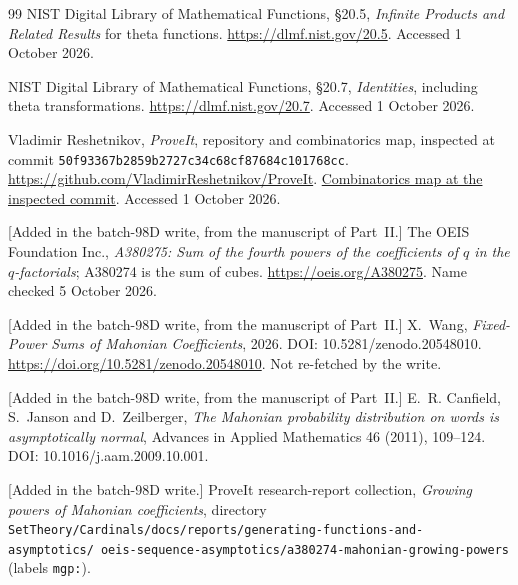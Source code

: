 \documentclass[11pt,a4paper]{article}
\numberwithin{equation}{section}
\theoremstyle{definition}
\newcommand{\code}[1]{\texttt{#1}}
\begin{document}
\begin{thebibliography}{99}
NIST Digital Library of Mathematical Functions,
\S20.5, \emph{Infinite Products and Related Results} for theta functions.
\url{https://dlmf.nist.gov/20.5}. Accessed 1 October 2026.

NIST Digital Library of Mathematical Functions,
\S20.7, \emph{Identities}, including theta transformations.
\url{https://dlmf.nist.gov/20.7}. Accessed 1 October 2026.

Vladimir Reshetnikov, \emph{ProveIt}, repository and combinatorics map,
inspected at commit
\texttt{50f93367b2859b2727c34c68cf87684c101768cc}.
\url{https://github.com/VladimirReshetnikov/ProveIt}.
\href{https://github.com/VladimirReshetnikov/ProveIt/blob/50f93367b2859b2727c34c68cf87684c101768cc/Combinatorics/README.md}{Combinatorics map at the inspected commit}.
Accessed 1 October 2026.

[Added in the batch-98D write, from the manuscript of Part~II.] The OEIS
Foundation Inc., \emph{A380275: Sum of the fourth powers of the
coefficients of $q$ in the $q$-factorials}; A380274 is the sum of cubes.
\url{https://oeis.org/A380275}. Name checked 5 October 2026.

[Added in the batch-98D write, from the manuscript of Part~II.]
X.~Wang, \emph{Fixed-Power Sums of Mahonian Coefficients}, 2026.
DOI: 10.5281/zenodo.20548010.
\url{https://doi.org/10.5281/zenodo.20548010}. Not re-fetched by the
write.

[Added in the batch-98D write, from the manuscript of Part~II.]
E.~R. Canfield, S.~Janson and D.~Zeilberger, \emph{The Mahonian
probability distribution on words is asymptotically normal}, Advances in
Applied Mathematics 46 (2011), 109--124. DOI: 10.1016/j.aam.2009.10.001.

\begingroup\raggedright
[Added in the batch-98D write.] ProveIt research-report collection,
\emph{Growing powers of Mahonian coefficients}, directory
\nolinkurl{SetTheory/Cardinals/docs/reports/generating-functions-and-asymptotics/}\
\nolinkurl{oeis-sequence-asymptotics/a380274-mahonian-growing-powers}
(labels \code{mgp:}).\par\endgroup

\end{thebibliography}
\end{document}
